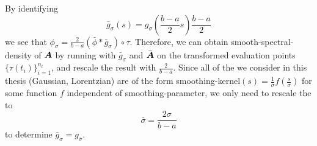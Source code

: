 By identifying
\begin{equation}
    \bar{g}_{\sigma}(s) = g_{\sigma}\left(\frac{b-a}{2}s\right) \frac{b-a}{2}
\end{equation}
we see that $\phi_{\sigma}= \frac{2}{b-a}(\bar{\phi} \ast \bar{g}_{\sigma}) \circ \tau$.
Therefore, we can obtain \gls{smooth-spectral-density} of $\boldsymbol{A}$ by running
 with $\bar{g}_{\sigma}$
and $\bar{\boldsymbol{A}}$ on the transformed evaluation points $\{ \tau(t_i) \}_{i=1}^{n_t}$,
and rescale the result with $\frac{2}{b-a}$.
Since all of the  we consider in this thesis (Gaussian, Lorentzian) are of the form
\gls{smoothing-kernel}$(s)=\frac{1}{\sigma}f(\frac{s}{\sigma})$ for some function $f$ independent of
\gls{smoothing-parameter}, we only need to rescale the  to
\begin{equation}
    \bar{\sigma} = \frac{2\sigma}{b - a}
    \label{equ:A-appendix-sigma-transformation}
\end{equation}
to determine $\bar{g}_{\sigma}=g_{\bar{\sigma}}$.\\

